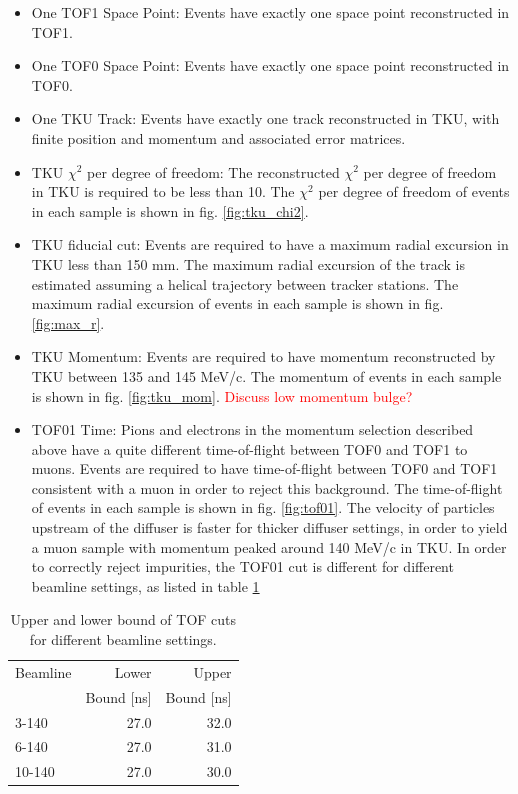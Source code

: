 \begin{itemize}
\item{One TOF1 Space Point:} Events have exactly one space point reconstructed in
TOF1.
\item{One TOF0 Space Point:} Events have exactly one space point reconstructed in
TOF0.
\item{One TKU Track:} Events have exactly one track reconstructed in TKU, with 
finite position and momentum and associated error matrices.
\item{TKU $\chi^2$ per degree of freedom:} The reconstructed $\chi^2$ per degree of freedom in TKU is 
required to be less than 10. The $\chi^2$ per degree of freedom of events in 
each sample is shown in fig. \ref{fig:tku_chi2}.
\item{TKU fiducial cut:} Events are required to have a maximum radial excursion 
in TKU less than 150 mm. The maximum radial excursion of the track is estimated
assuming a helical trajectory between tracker stations. The maximum radial
excursion of events in each sample is shown in fig. \ref{fig:max_r}.
\item{TKU Momentum:} Events are required to have momentum reconstructed by TKU 
between 135 and 145 MeV/c. The momentum of events in each sample is shown in 
fig. \ref{fig:tku_mom}.
\textcolor{red}{Discuss low momentum bulge?}
\item{TOF01 Time:} Pions and electrons in the momentum selection described above
have a quite different time-of-flight between TOF0 and TOF1 to muons. Events are 
required to have time-of-flight between TOF0 and TOF1 consistent with a muon in
order to reject this background. The time-of-flight of events in each sample is 
shown in fig. \ref{fig:tof01}. The velocity of particles upstream of the diffuser
is faster for thicker diffuser settings, in order to yield a muon sample with
momentum peaked around 140 MeV/c in TKU. In order to correctly reject impurities,
the TOF01 cut is different for different beamline settings, as listed in table 
\ref{tab:tof01_cut}
\end{itemize}

\begin{table}
\caption{Upper and lower bound of TOF cuts for different beamline settings.
\label{tab:tof01_cut}}
\centering
\begin{tabular}[pos]{l|rr}
Beamline & Lower       & Upper \\
         & Bound [ns]  & Bound [ns] \\
\hline
3-140    & 27.0          & 32.0 \\
6-140    & 27.0          & 31.0 \\
10-140   & 27.0          & 30.0 \\
\end{tabular}
\end{table}


